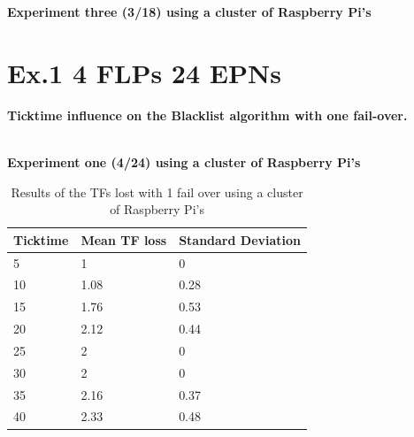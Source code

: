 \begin{table}[h!]
\caption*{\textbf{Experiment three (3/18) using a cluster of Raspberry Pi's}}
\caption{Cumulative lost TFs by ticktime/EPN ratio with a random sample size for the Blacklist algorithm}
\label{table:Ex3318Results}
\end{table}

\newpage

\section{Ex.1 4 FLPs 24 EPNs}
\textbf{Ticktime influence on the Blacklist algorithm with one fail-over.}
\\~\\

\begin{table}[h!]
\caption*{\textbf{Experiment one (4/24) using a cluster of Raspberry Pi's}}
\begin{tabular}{| l | l | l |}
\hline
Ticktime & Mean TF loss & Standard Deviation \\ \hline
5 & 1 & 0 \\ \hline
10 & 1.08 & 0.28 \\ \hline
15 & 1.76 & 0.53 \\ \hline
20 & 2.12 & 0.44 \\ \hline
25 & 2 & 0 \\ \hline
30 & 2 & 0 \\ \hline
35 & 2.16 & 0.37 \\ \hline
40 & 2.33 & 0.48 \\ \hline
\end{tabular}
\caption{Results of the TFs lost with 1 fail over using a cluster of Raspberry Pi's}
\label{table:Ex1424Results}
\end{table}

